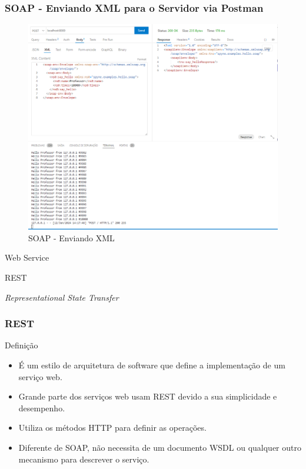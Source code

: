 \documentclass[
	10pt, %
	t, %
]{beamer}
\begin{document}
\begin{frame}[fragile]
	\frametitle{SOAP - Enviando XML para o Servidor via Postman}
	
	\begin{figure}
		\includegraphics[width=0.7\linewidth]{soap_http_request_example.PNG}
		\caption{SOAP - Enviando XML}
		\label{fig:soap_server_xml_2}
	\end{figure}

\end{frame}


\begin{frame}
	\begin{center}
		
		\bigskip\bigskip\bigskip\bigskip %
		{\Large Web Service}
		
		\bigskip\bigskip %
		{\Huge REST}
		
		\smallskip
		{\small \textit{Representational State Transfer}}
	\end{center}

\end{frame}

\begin{frame}
	\frametitle{REST}
	
	\begin{block}{Definição}
		\begin{itemize}
			\item É um estilo de arquitetura de software que define a implementação de um serviço web.
			\item Grande parte dos serviços web usam REST devido a sua simplicidade e desempenho.
			\item Utiliza os métodos HTTP para definir as operações.
			\item Diferente de SOAP, não necessita de um documento WSDL ou qualquer outro mecanismo para descrever o serviço.
		\end{itemize}
	\end{block}

\end{frame}
\end{document}
